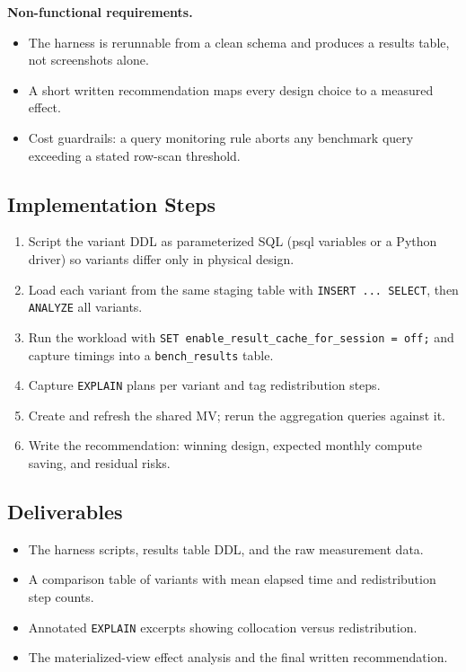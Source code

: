 \textbf{Non-functional requirements.}
\begin{itemize}
    \item The harness is rerunnable from a clean schema and produces a results table, not screenshots alone.
    \item A short written recommendation maps every design choice to a measured effect.
    \item Cost guardrails: a query monitoring rule aborts any benchmark query exceeding a stated row-scan threshold.
\end{itemize}

\subsection*{Implementation Steps}
\begin{enumerate}
    \item Script the variant DDL as parameterized SQL (psql variables or a Python driver) so variants differ only in physical design.
    \item Load each variant from the same staging table with \texttt{INSERT ... SELECT}, then \texttt{ANALYZE} all variants.
    \item Run the workload with \texttt{SET enable\_result\_cache\_for\_session = off;} and capture timings into a \texttt{bench\_results} table.
    \item Capture \texttt{EXPLAIN} plans per variant and tag redistribution steps.
    \item Create and refresh the shared MV; rerun the aggregation queries against it.
    \item Write the recommendation: winning design, expected monthly compute saving, and residual risks.
\end{enumerate}

\subsection*{Deliverables}
\begin{itemize}
    \item The harness scripts, results table DDL, and the raw measurement data.
    \item A comparison table of variants with mean elapsed time and redistribution step counts.
    \item Annotated \texttt{EXPLAIN} excerpts showing collocation versus redistribution.
    \item The materialized-view effect analysis and the final written recommendation.
\end{itemize}

